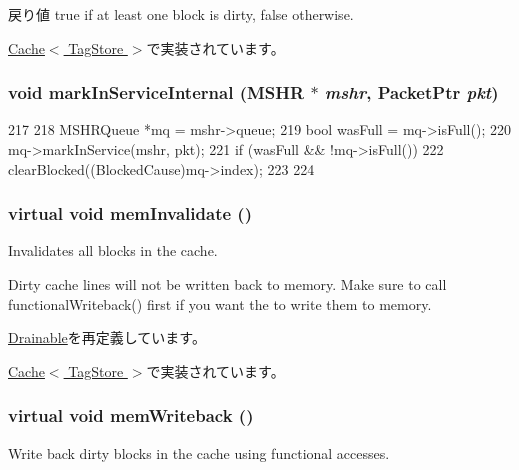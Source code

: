 \begin{DoxyReturn}{戻り値}
true if at least one block is dirty, false otherwise. 
\end{DoxyReturn}


\hyperlink{classCache_ad66f409af3c387e166ff7ee95169b7b6}{Cache$<$ TagStore $>$}で実装されています。\hypertarget{classBaseCache_a08042a551e2a1bcdd036c84d277bc89f}{
\subsubsection[{markInServiceInternal}]{\setlength{\rightskip}{0pt plus 5cm}void markInServiceInternal ({\bf MSHR} $\ast$ {\em mshr}, \/  {\bf PacketPtr} {\em pkt})}}
\label{classBaseCache_a08042a551e2a1bcdd036c84d277bc89f}



\begin{DoxyCode}
217     {
218         MSHRQueue *mq = mshr->queue;
219         bool wasFull = mq->isFull();
220         mq->markInService(mshr, pkt);
221         if (wasFull && !mq->isFull()) {
222             clearBlocked((BlockedCause)mq->index);
223         }
224     }
\end{DoxyCode}
\hypertarget{classBaseCache_aeb9356f940fbf8410f41920ee1d5864d}{
\subsubsection[{memInvalidate}]{\setlength{\rightskip}{0pt plus 5cm}virtual void memInvalidate ()}}
\label{classBaseCache_aeb9356f940fbf8410f41920ee1d5864d}
Invalidates all blocks in the cache.

Dirty cache lines will not be written back to memory. Make sure to call functionalWriteback() first if you want the to write them to memory. 

\hyperlink{classDrainable_a7f243f736712f56d8dd50cd21c77b9d1}{Drainable}を再定義しています。

\hyperlink{classCache_afea64b0aa579c17485db54c6a5c2ede3}{Cache$<$ TagStore $>$}で実装されています。\hypertarget{classBaseCache_afd3c83f1883488031612de6c47fcaabb}{
\subsubsection[{memWriteback}]{\setlength{\rightskip}{0pt plus 5cm}virtual void memWriteback ()}}
\label{classBaseCache_afd3c83f1883488031612de6c47fcaabb}
Write back dirty blocks in the cache using functional accesses. 

